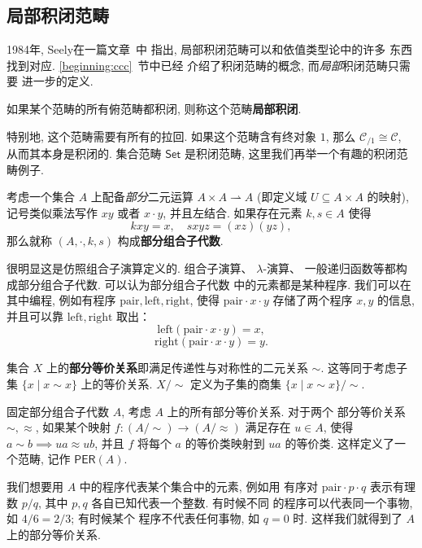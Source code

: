 \subsection{局部积闭范畴}
1984年, Seely在一篇文章~\cite{seely:1984:lccc}中
指出, 局部积闭范畴可以和依值类型论中的许多
东西找到对应. \ref{beginning:ccc}~节中已经
介绍了积闭范畴的概念, 而\emph{局部}积闭范畴只需要
进一步的定义.
\begin{definition}
如果某个范畴的所有俯范畴都积闭, 则称这个范畴\textbf{局部积闭}.
\end{definition}
特别地, 这个范畴需要有所有的拉回. 如果这个范畴含有终对象
\(1\), 那么 \(\mathcal C_{/1} \cong \mathcal C\),
从而其本身是积闭的. 集合范畴 \(\mathsf{Set}\) 是积闭范畴,
这里我们再举一个有趣的积闭范畴例子.
\begin{definition}
考虑一个集合 \(A\) 上配备\emph{部分}二元运算
\(A \times A \rightharpoonup A\)
(即定义域 \(U \subseteq A \times A\) 的映射),
记号类似乘法写作 \(xy\) 或者 \(x \cdot y\), 并且左结合.
如果存在元素 \(k, s \in A\) 使得
\[k x y = x, \quad sxyz = (xz)(yz),\]
那么就称 \((A, \cdot, k, s)\) 构成\textbf{部分组合子代数}.
\end{definition}
很明显这是仿照组合子演算定义的. 组合子演算、 \(\lambda\)-演算、
一般递归函数等都构成部分组合子代数. 可以认为部分组合子代数
中的元素都是某种程序. 我们可以在其中编程, 例如有程序
\(\mathrm{pair}, \mathrm{left}, \mathrm{right}\),
使得 \(\mathrm{pair} \cdot x \cdot y\) 存储了两个程序
\(x,y\) 的信息, 并且可以靠 \(\mathrm{left}, \mathrm{right}\)
取出： \[\mathrm{left}(\mathrm{pair} \cdot x \cdot y) = x,\]
\[\mathrm{right}(\mathrm{pair} \cdot x \cdot y) = y.\]

\begin{definition}
集合 \(X\) 上的\textbf{部分等价关系}即满足传递性与对称性的二元关系 \(\sim\).
这等同于考虑子集 \(\{x \mid x \sim x\}\) 上的等价关系.
\(X/{\sim}\) 定义为子集的商集 \(\{x \mid x \sim x\}/{\sim}\).
\end{definition}

\begin{definition}
固定部分组合子代数 \(A\), 考虑 \(A\) 上的所有部分等价关系. 对于两个
部分等价关系 \(\sim, \approx\), 如果某个映射 \(f : (A/{\sim}) \to (A/{\approx})\)
满足存在 \(u \in A\), 使得 \(a \sim b \implies ua \approx ub\),
并且 \(f\) 将每个 \(a\) 的等价类映射到 \(ua\) 的等价类.
这样定义了一个范畴, 记作 \(\mathsf{PER}(A)\).
\end{definition}
我们想要用 \(A\) 中的程序代表某个集合中的元素, 例如用
有序对 \(\mathrm{pair} \cdot p \cdot q\) 表示有理数
\(p/q\), 其中 \(p,q\) 各自已知代表一个整数. 有时候不同
的程序可以代表同一个事物, 如 \(4/6 = 2/3\); 有时候某个
程序不代表任何事物, 如 \(q = 0\) 时. 这样我们就得到了 \(A\)
上的部分等价关系.


